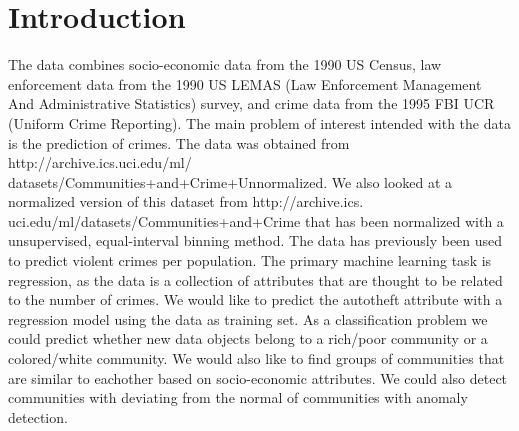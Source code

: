 \documentclass[a4paper,10pt]{article}
\begin{document}
\author{Valentin Rosenberg, Zacharias Dyna Knudsen}
\date{\today}

\tableofcontents
\newpage

\section{Introduction}
The data combines socio-economic data from the 1990 US Census, law enforcement data from the 1990 US LEMAS (Law Enforcement Management And Administrative Statistics) survey, and crime data from the 1995 FBI UCR (Uniform Crime Reporting). The main problem of interest intended with the data is the prediction of crimes.
The data was obtained from http://archive.ics.uci.edu/ml/\newline
datasets/Communities+and+Crime+Unnormalized. We also looked at a normalized version of this dataset from http://archive.ics.\newline
uci.edu/ml/datasets/Communities+and+Crime that has been normalized with a unsupervised, equal-interval binning method. The data has previously been used to predict violent crimes per population.
The primary machine learning task is regression, as the data is a collection of attributes that are thought to be related to the number of crimes. We would like to predict the autotheft attribute with a regression model using the data as training set. As a classification problem we could predict whether new data objects belong to a rich/poor community or a colored/white community. We would also like to find groups of communities that are similar to eachother based on socio-economic attributes. We could also detect communities with deviating from the normal of communities with anomaly detection. 
\end{document}
